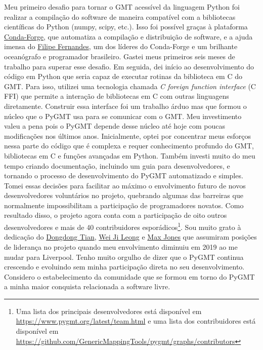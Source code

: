 \documentclass[10pt,a4paper,oneside]{book}
\begin{document}
Meu primeiro desafio para tornar o GMT acessível da linguagem Python foi
realizar a compilação do software de maneira compatível com a bibliotecas
científicas do Python (numpy, scipy, etc.).
Isso foi possível graças à plataforma
\href{https://conda-forge.org/}{Conda-Forge}, que automatiza a compilação e
distribuição de software, e a ajuda imensa do
\href{https://github.com/ocefpaf}{Filipe Fernandes}, um dos líderes do
Conda-Forge e um brilhante oceanógrafo e programador brasileiro.
Gastei meus primeiros seis meses de trabalho para superar esse desafio.
Em seguida, dei início ao desenvolvimento do código em Python que seria capaz
de executar rotinas da biblioteca em C do GMT.
Para isso, utilizei uma tecnologia chamada \textit{C foreign function
interface} (C FFI) que permite a interação de bibliotecas em C com outras
linguagens diretamente.
Construir essa interface foi um trabalho árduo mas que formou o núcleo que o
PyGMT usa para se comunicar com o GMT.
Meu investimento valeu a pena pois o PyGMT depende desse núcleo até hoje com
poucas modificações nos últimos anos.
Inicialmente, optei por concentrar meus esforços nessa parte do código que é
complexa e requer conhecimento profundo do GMT, bibliotecas em C e funções
avançadas em Python.
Também investi muito do meu tempo criando documentação, incluindo um guia para
desenvolvedores, e tornando o processo de desenvolvimento do PyGMT
automatizado e simples.
Tomei essas decisões para facilitar ao máximo o envolvimento futuro de novos
desenvolvedores voluntários no projeto, quebrando algumas das barreiras que
normalmente impossibilitam a participação de programadores novatos.
Como resultado disso, o projeto agora conta com a participação de oito outros
desenvolvedores e mais de 40 contribuidores esporádicos\footnote{Uma lista dos
principais desenvolvedores está disponível em \url{https://www.pygmt.org/latest/team.html}
e uma lista dos contribuidores está disponível em \url{https://github.com/GenericMappingTools/pygmt/graphs/contributors}}.
Sou muito grato à dedicação do
\href{https://github.com/seisman}{Dongdong Tian},
\href{https://weiji14.github.io/}{Wei Ji Leong} e
\href{https://github.com/maxrjones}{Max Jones}
que assumiram posições de liderança no projeto quando meu envolvimento diminuiu
em 2019 ao me mudar para Liverpool.
Tenho muito orgulho de dizer que o PyGMT continua crescendo e evoluindo sem
minha participação direta no seu desenvolvimento.
Considero o estabelecimento da comunidade que se formou em torno do PyGMT a
minha maior conquista relacionada a software livre.
\end{document}
